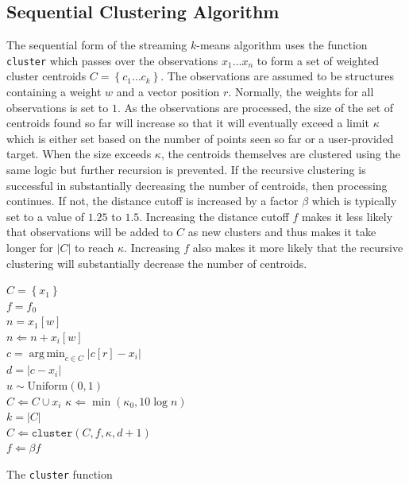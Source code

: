 \documentclass[11pt]{amsart}
\DeclareMathOperator{\argmin}{arg\,min}
\begin{document}
\subsection{Sequential Clustering Algorithm}
The sequential form of the streaming $k$-means algorithm uses the function {\tt cluster} which passes over the observations $x_1 \ldots x_n$  to form a set of weighted cluster centroids $C = \left\lbrace c_1 \ldots c_k\right\rbrace$.  The observations are assumed to be structures containing a weight $w$ and a vector position $r$.  Normally, the weights for all observations is set to $1$.  As the observations are processed, the size of the set of centroids found so far will increase so that it will eventually exceed a limit $\kappa$ which is either set based on the number of points seen so far or a user-provided target.  When the size exceeds $\kappa$, the centroids themselves are clustered using the same logic but further recursion is prevented.  If the recursive clustering is successful in substantially decreasing the number of centroids, then processing continues.  If not, the distance cutoff is increased by a factor $\beta$ which is typically set to a value of $1.25$ to $1.5$.  Increasing the distance cutoff $f$ makes it less likely that observations will be added to $C$ as new clusters and thus makes it take longer for $|C|$ to reach $\kappa$.  Increasing $f$ also makes it more likely that the recursive clustering will substantially decrease the number of centroids.

\begin{algorithm}[H]
\SetNoFillComment
{}
$C = \left \lbrace x_1 \right \rbrace$ \\
$f = f_0$ \\
$n = x_1[w]$ \\
 {
   $n \Leftarrow n + x_i[w]$ \\
   $c = \argmin_{c \in C} \left | c[r] - x_i \right |$\\
   $d = |c-x_i|$ \\
   $u \sim \mathrm{Uniform}(0,1)$\\
    {
       $C \Leftarrow C \cup  x_i$ 
   }
   $\kappa \Leftarrow \min(\kappa_0, 10 \log n)$ \\
    {
      $k = |C|$ \\
      $C \Leftarrow \mathtt {cluster}( C, f, \kappa, d+1 )$ \\
       {
          $ f \Leftarrow \beta f$
      }
   }
}
\caption{The {\tt cluster} function}
\end{algorithm}
\end{document}
